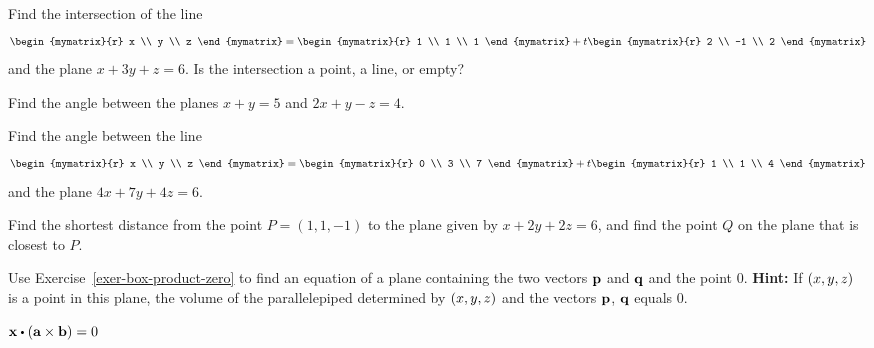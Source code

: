 \begin{enumialphparenastyle}
\begin{ex}
Find the intersection of the line
  \begin{equation*}
    \begin{mymatrix}{r} x \\ y \\ z \end{mymatrix}
    = \begin{mymatrix}{r} 1 \\ 1 \\ 1 \end{mymatrix}
    + t \begin{mymatrix}{r} 2 \\ -1 \\ 2 \end{mymatrix}
  \end{equation*}
  and the plane $x+3y+z = 6$.
  Is the intersection a point, a line, or empty?
\end{ex}

\begin{ex}
  Find the angle between the planes $x+y=5$ and $2x+y-z=4$.
\end{ex}

\begin{ex}
  Find the angle between the line
  \begin{equation*}
    \begin{mymatrix}{r} x \\ y \\ z \end{mymatrix}
    = \begin{mymatrix}{r} 0 \\ 3 \\ 7 \end{mymatrix}
    + t \begin{mymatrix}{r} 1 \\ 1 \\ 4 \end{mymatrix}
  \end{equation*}
  and the plane $4x+7y+4z = 6$.
\end{ex}

\begin{ex}
  Find the shortest distance from the point $P = (1,1,-1)$ to the plane
  given by $x + 2y + 2z = 6$, and find the point $Q$ on the plane
  that is closest to $P$.
\end{ex}

\begin{ex}
  Use Exercise~\ref{exer-box-product-zero} to find an equation of a
  plane containing the two vectors $\mbox{\bf p}$ and $\mbox{\bf q}$ and the
  point $0$. \textbf{Hint:} If $\left(x,y,z\right)$ is a point in this
  plane, the volume of the parallelepiped determined by $\left(x,y,z\right)$
  and the vectors $\mbox{\bf p}$, $\mbox{\bf q}$ equals 0.
  \begin{sol}
    $\vect{x}\dotprod \tup{\vect{a}\times \vect{b}} =0$
  \end{sol}
\end{ex}

\end{enumialphparenastyle}
